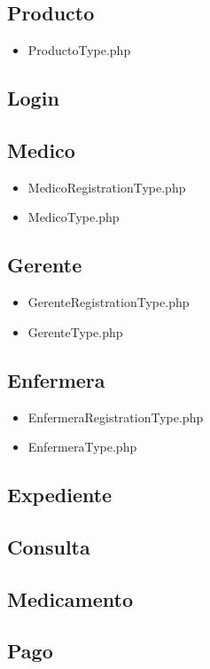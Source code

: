 		\subsection{Producto}
		\begin{itemize}
		\item ProductoType.php
		\end{itemize}
		\subsection{Login}
		\subsection{Medico}
		\begin{itemize}
		\item MedicoRegistrationType.php
		\item MedicoType.php
		\end{itemize}
		
		\subsection{Gerente}
		\begin{itemize}
		\item GerenteRegistrationType.php
		\item GerenteType.php
		\end{itemize}
		
		\subsection{Enfermera}
		\begin{itemize}
		\item EnfermeraRegistrationType.php
		\item EnfermeraType.php
		\end{itemize}
		
		\subsection{Expediente}
		\subsection{Consulta}
		\subsection{Medicamento}
		\subsection{Pago}
